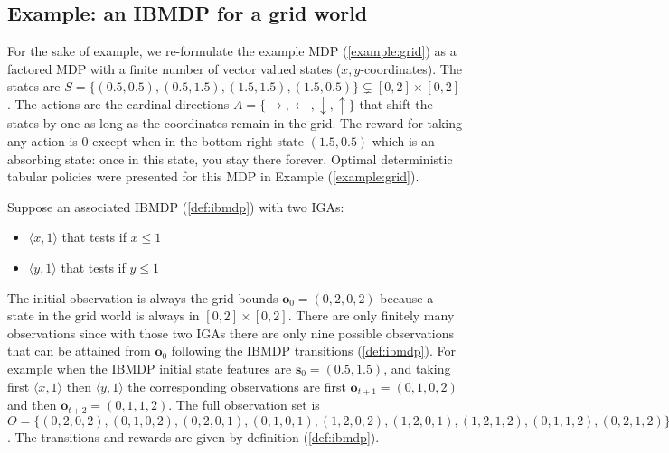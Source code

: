 \subsection{Example: an IBMDP for a grid world}
For the sake of example, we re-formulate the example MDP (\ref{example:grid}) as a factored MDP with a finite number of vector valued states ($x,y$-coordinates).
The states are $S = \{(0.5, 0.5), (0.5, 1.5), (1.5, 1.5), (1.5, 0.5)\}\subsetneq [0, 2] \times [0, 2]$.
The actions are the cardinal directions $A = \{\rightarrow, \leftarrow, \downarrow, \uparrow\}$ that shift the states by one as long as the coordinates remain in the grid.
The reward for taking any action is 0 except when in the bottom right state $(1.5, 0.5)$ which is an absorbing state: once in this state, you stay there forever. 
Optimal deterministic tabular policies were presented for this MDP in Example (\ref{example:grid}).

Suppose an associated IBMDP (\ref{def:ibmdp}) with two IGAs:
\begin{itemize}
    \item $\langle x, 1\rangle$ that tests if $x\leq 1$
    \item $\langle y, 1\rangle$ that tests if $y\leq 1$
\end{itemize}
The initial observation is always the grid bounds $\boldsymbol{o}_0=(0, 2, 0, 2)$ because a state in the grid world is always in $[0, 2] \times [0, 2]$.
There are only finitely many observations since with those two IGAs there are only nine possible observations that can be attained from $\boldsymbol{o}_0$ following the IBMDP transitions (\ref{def:ibmdp}).
For example when the IBMDP initial state features are $\boldsymbol{s}_0 = (0.5, 1.5)$, and taking first $\langle x, 1\rangle$ then $\langle y, 1\rangle$ the corresponding observations are first $\boldsymbol{o}_{t+1} = (0, 1, 0, 2)$ and then $\boldsymbol{o}_{t+2} = (0, 1, 1, 2)$.
The full observation set is $O = \{(0, 2, 0, 2), (0, 1, 0, 2), (0, 2, 0, 1), (0, 1, 0, 1), (1, 2, 0, 2), (1, 2, 0, 1), (1, 2, 1, 2), (0, 1, 1, 2), (0, 2, 1, 2)\}$.
The transitions and rewards are given by definition (\ref{def:ibmdp}).


